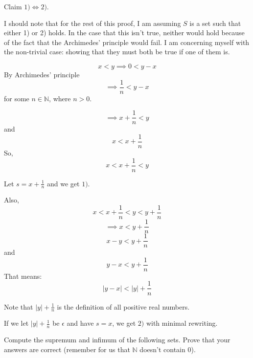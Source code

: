 \documentclass[answers]{exam}
\theoremstyle{remark}
\theoremstyle{definition}
\newcommand{\NN}{\mathbb{N}}
\begin{document}
\begin{questions}
\begin{solution}
Claim $1) \iff 2)$.

I should note that for the rest of this proof,
I am assuming $S$ is a set such that either 1) or 2) holds.
In the case that this isn't true, neither would hold
because of the fact that the Archimedes' principle would fail.
I am concerning myself with the non-trivial case:
showing that they must both be true if one of them is.


\[x < y
\implies 0 < y-x\]
By Archimedes' principle
\[\implies \frac{1}{n} < y-x\]
for some $n \in \NN$, where $n > 0$.

\[\implies x + \frac{1}{n} < y\]
and
\[x < x + \frac{1}{n}\]
So,
\[x < x + \frac{1}{n} < y\]

Let $s = x + \frac{1}{n}$ and we get $1)$.

Also,
\[x < x + \frac{1}{n} < y < y + \frac{1}{n}\]
\[\implies x < y + \frac{1}{n}\]
\[x-y < y + \frac{1}{n}\]
and
\[y-x < y + \frac{1}{n}\]
That means:
\[|y-x| < |y| + \frac{1}{n}\]

Note that $|y| + \frac{1}{n}$ is the definition of
all positive real numbers.

If we let $|y| + \frac{1}{n}$ be $\epsilon$ and have $s = x$,
we get $2)$ with minimal rewriting.

 \end{solution}


\question Compute the supremum and infimum of the following sets. Prove that your answers are correct (remember for us that $\NN$ doesn't contain $0$).

\begin{solution}
\end{solution}
\end{questions}
\end{document}
